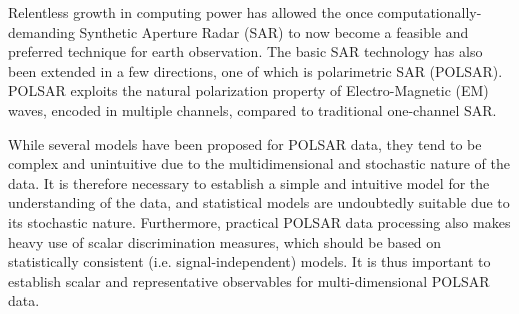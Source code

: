 \documentclass[journal]{IEEEtran}
\begin{document}
Relentless growth in computing power has allowed the once computationally-demanding Synthetic Aperture Radar (SAR) to now become a feasible and preferred technique for earth observation.
The basic SAR technology has also been extended in a few directions, one of which is polarimetric SAR (POLSAR).
POLSAR exploits the natural polarization property of Electro-Magnetic (EM) waves,
   encoded in multiple channels, compared to traditional one-channel SAR.
  

While several models have been proposed for POLSAR data, they tend to be complex and unintuitive due to the multidimensional and stochastic nature of the data.
It is therefore necessary to establish a simple and intuitive model for the 
understanding of the data, and statistical models are undoubtedly suitable due to its stochastic nature.
Furthermore, practical POLSAR data processing also makes heavy use of scalar discrimination measures,
  which should be based on statistically consistent (i.e. signal-independent) models. %
It is thus important to establish scalar and representative observables for multi-dimensional POLSAR data.
  
\end{document}
